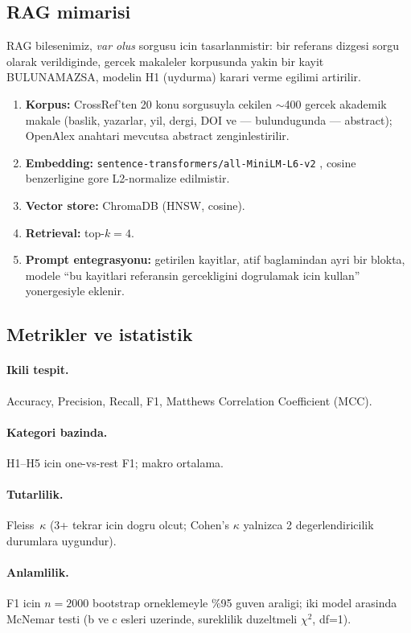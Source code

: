 \documentclass[11pt,a4paper]{article}
\begin{document}
\subsection{RAG mimarisi}
\label{sub:rag}
RAG bilesenimiz, \emph{var olus} sorgusu icin tasarlanmistir: bir referans
dizgesi sorgu olarak verildiginde, gercek makaleler korpusunda yakin bir
kayit BULUNAMAZSA, modelin H1 (uydurma) karari verme egilimi artirilir.

\begin{enumerate}[nosep]
\item \textbf{Korpus:} CrossRef'ten 20 konu sorgusuyla cekilen $\sim$400 gercek
akademik makale (baslik, yazarlar, yil, dergi, DOI ve --- bulundugunda ---
abstract); OpenAlex anahtari mevcutsa abstract zenginlestirilir.
\item \textbf{Embedding:} \texttt{sentence-transformers/all-MiniLM-L6-v2}
\cite{reimers2019sbert}, cosine benzerligine gore L2-normalize edilmistir.
\item \textbf{Vector store:} ChromaDB (HNSW, cosine).
\item \textbf{Retrieval:} top-$k=4$.
\item \textbf{Prompt entegrasyonu:} getirilen kayitlar, atif baglamindan ayri
bir blokta, modele ``bu kayitlari referansin gercekligini dogrulamak icin
kullan'' yonergesiyle eklenir.
\end{enumerate}

\subsection{Metrikler ve istatistik}
\paragraph{Ikili tespit.} Accuracy, Precision, Recall, F1, Matthews
Correlation Coefficient (MCC).
\paragraph{Kategori bazinda.} H1--H5 icin one-vs-rest F1; makro ortalama.
\paragraph{Tutarlilik.} Fleiss~$\kappa$ (3+ tekrar icin
dogru olcut; Cohen's $\kappa$ yalnizca 2 degerlendiricilik durumlara uygundur).
\paragraph{Anlamlilik.} F1 icin $n=2000$ bootstrap orneklemeyle \%95 guven
araligi; iki model arasinda McNemar testi (b ve c esleri uzerinde, sureklilik
duzeltmeli $\chi^2$, df=1).
\end{document}
